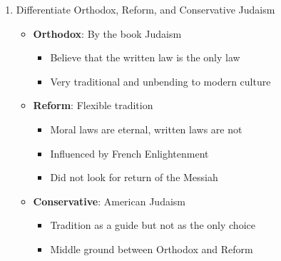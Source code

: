 \documentclass[8pt]{article}
\begin{document}
\begin{enumerate}
        \item Differentiate Orthodox, Reform, and Conservative Judaism
            \begin{itemize}
                \item \textbf{Orthodox}: By the book Judaism
                \begin{itemize}
                    \item Believe that the written law is the only law
                    \item Very traditional and unbending to modern culture
                \end{itemize}
                \item \textbf{Reform}: Flexible tradition
                \begin{itemize}
                    \item Moral laws are eternal, written laws are not
                    \item Influenced by French Enlightenment
                    \item Did not look for return of the Messiah
                \end{itemize}
                \item \textbf{Conservative}: American Judaism
                \begin{itemize}
                    \item Tradition as a guide but not as the only choice
                    \item Middle ground between Orthodox and Reform
                \end{itemize}
            \end{itemize}


\end{enumerate}
\end{document}
